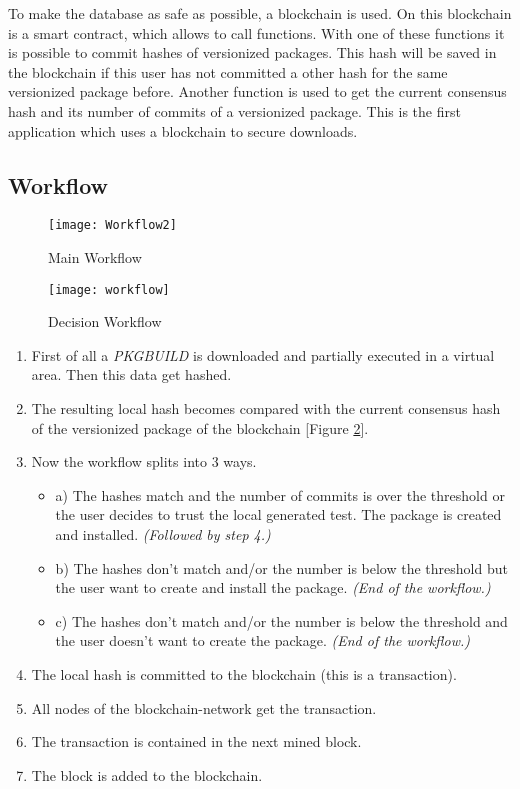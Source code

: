 To make the database as safe as possible, a blockchain is used. On this blockchain is a smart contract, which allows to call functions. With one of these functions it is possible to commit hashes of versionized packages. This hash will be saved in the blockchain if this user has not committed a other hash for the same versionized package before. Another function is used to get the current consensus hash and its number of commits of a versionized package. This is the first application which uses a blockchain to secure downloads.

\subsection*{Workflow}
\begin{figure}
	\centering
		\texttt{[image: Workflow2]}
	\caption{Main Workflow}
	\label{fig:main_workflow}
\end{figure}

\begin{figure}
	\centering
		\texttt{[image: workflow]}
	\caption{Decision Workflow}
	\label{fig:decision_workflow}
\end{figure}


\begin{enumerate}
	\item First of all a \textit{PKGBUILD} is downloaded and partially executed in a virtual area. Then this data get hashed. 
	\item The resulting local hash becomes compared with the current consensus hash of the versionized package of the blockchain [Figure \ref{fig:decision_workflow}]. 
	\item Now the workflow splits into 3 ways.
	\begin{itemize}
		\item a) The hashes match and the number of commits is over the threshold or the user decides to trust the local generated test. The package is created and installed. \textit{(Followed by step 4.)}
		\item b) The hashes don't match and/or the number is below the threshold but the user want to create and install the package. \textit{(End of the workflow.)}
		\item c) The hashes don't match and/or the number is below the threshold and the user doesn't want to create the package. \textit{(End of the workflow.)}
	\end{itemize}
	\item The local hash is committed to the blockchain (this is a transaction).
	\item All nodes of the blockchain-network get the transaction.
	\item The transaction is contained in the next mined block.
	\item The block is added to the blockchain.
\end{enumerate}